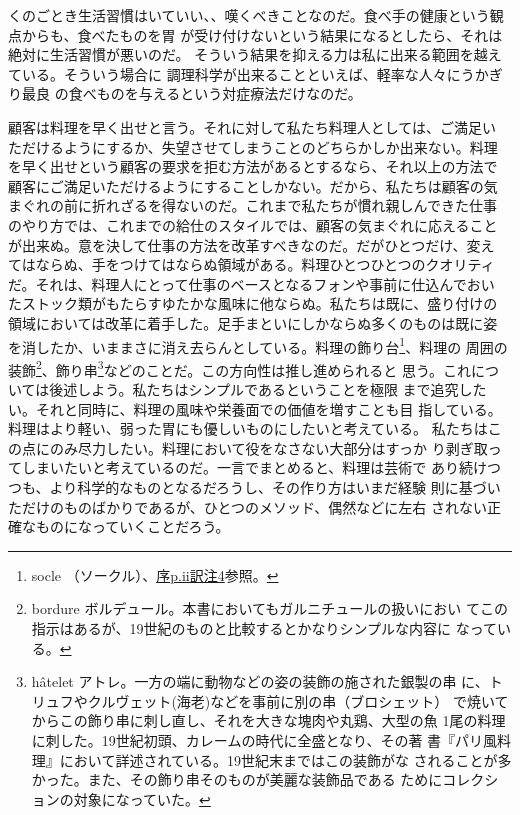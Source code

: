 くのごとき生活習慣はいていい、、嘆くべきことなのだ。食べ手の健康という観点からも、食べたものを胃
が受け付けないという結果になるとしたら、それは絶対に生活習慣が悪いのだ。
そういう結果を抑える力は私に出来る範囲を越えている。そういう場合に
調理科学が出来ることといえば、軽率な人々にうかぎり最良
の食べものを与えるという対症療法だけなのだ。

顧客は料理を早く出せと言う。それに対して私たち料理人としては、ご満足い
ただけるようにするか、失望させてしまうことのどちらかしか出来ない。料理
を早く出せという顧客の要求を拒む方法があるとするなら、それ以上の方法で
顧客にご満足いただけるようにすることしかない。だから、私たちは顧客の気
まぐれの前に折れざるを得ないのだ。これまで私たちが慣れ親しんできた仕事
のやり方では、これまでの給仕のスタイルでは、顧客の気まぐれに応えること
が出来ぬ。意を決して仕事の方法を改革すべきなのだ。だがひとつだけ、変え
てはならぬ、手をつけてはならぬ領域がある。料理ひとつひとつのクオリティ
だ。それは、料理人にとって仕事のベースとなるフォンや事前に仕込んでおい
たストック類がもたらすゆたかな風味に他ならぬ。私たちは既に、盛り付けの
領域においては改革に着手した。足手まといにしかならぬ多くのものは既に姿
を消したか、いままさに消え去らんとしている。料理の飾り台\footnote{socle
  （ソークル）、\protect\hyperlink{socle}{序p.ii訳注4}参照。}、料理の
周囲の装飾\footnote{bordure
  ボルデュール。本書においてもガルニチュールの扱いにおい
  てこの指示はあるが、19世紀のものと比較するとかなりシンプルな内容に
  なっている。}、飾り串\footnote{hâtelet
  アトレ。一方の端に動物などの姿の装飾の施された銀製の串
  に、トリュフやクルヴェット(海老)などを事前に別の串（ブロシェット）
  で焼いてからこの飾り串に刺し直し、それを大きな塊肉や丸鶏、大型の魚
  1尾の料理に刺した。19世紀初頭、カレームの時代に全盛となり、その著
  書『パリ風料理』において詳述されている。19世紀末まではこの装飾がな
  されることが多かった。また、その飾り串そのものが美麗な装飾品である
  ためにコレクションの対象になっていた。}などのことだ。この方向性は推し進められると
思う。これについては後述しよう。私たちはシンプルであるということを極限
まで追究したい。それと同時に、料理の風味や栄養面での価値を増すことも目
指している。料理はより軽い、弱った胃にも優しいものにしたいと考えている。
私たちはこの点にのみ尽力したい。料理において役をなさない大部分はすっか
り剥ぎ取ってしまいたいと考えているのだ。一言でまとめると、料理は芸術で
あり続けつつも、より科学的なものとなるだろうし、その作り方はいまだ経験
則に基づいただけのものばかりであるが、ひとつのメソッド、偶然などに左右
されない正確なものになっていくことだろう。

